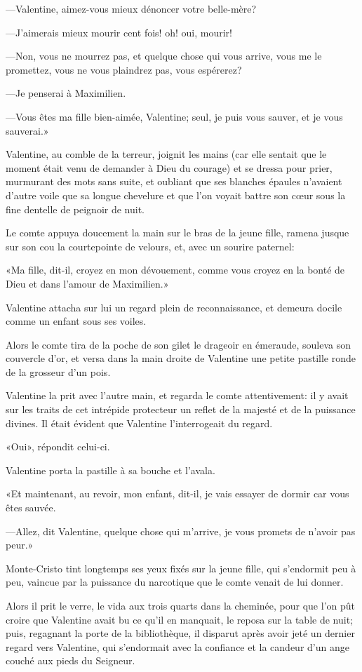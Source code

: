 —Valentine, aimez-vous mieux dénoncer votre belle-mère? 

—J'aimerais mieux mourir cent fois! oh! oui, mourir! 

—Non, vous ne mourrez pas, et quelque chose qui vous arrive, vous me le promettez, vous ne vous plaindrez pas, vous espérerez? 

—Je penserai à Maximilien. 

—Vous êtes ma fille bien-aimée, Valentine; seul, je puis vous sauver, et je vous sauverai.» 

Valentine, au comble de la terreur, joignit les mains (car elle sentait que le moment était venu de demander à Dieu du courage) et se dressa pour prier, murmurant des mots sans suite, et oubliant que ses blanches épaules n'avaient d'autre voile que sa longue chevelure et que l'on voyait battre son cœur sous la fine dentelle de peignoir de nuit. 

Le comte appuya doucement la main sur le bras de la jeune fille, ramena jusque sur son cou la courtepointe de velours, et, avec un sourire paternel: 

«Ma fille, dit-il, croyez en mon dévouement, comme vous croyez en la bonté de Dieu et dans l'amour de Maximilien.» 

Valentine attacha sur lui un regard plein de reconnaissance, et demeura docile comme un enfant sous ses voiles. 

Alors le comte tira de la poche de son gilet le drageoir en émeraude, souleva son couvercle d'or, et versa dans la main droite de Valentine une petite pastille ronde de la grosseur d'un pois. 

Valentine la prit avec l'autre main, et regarda le comte attentivement: il y avait sur les traits de cet intrépide protecteur un reflet de la majesté et de la puissance divines. Il était évident que Valentine l'interrogeait du regard. 

«Oui», répondit celui-ci. 

Valentine porta la pastille à sa bouche et l'avala. 

«Et maintenant, au revoir, mon enfant, dit-il, je vais essayer de dormir car vous êtes sauvée. 

—Allez, dit Valentine, quelque chose qui m'arrive, je vous promets de n'avoir pas peur.» 

Monte-Cristo tint longtemps ses yeux fixés sur la jeune fille, qui s'endormit peu à peu, vaincue par la puissance du narcotique que le comte venait de lui donner. 

Alors il prit le verre, le vida aux trois quarts dans la cheminée, pour que l'on pût croire que Valentine avait bu ce qu'il en manquait, le reposa sur la table de nuit; puis, regagnant la porte de la bibliothèque, il disparut après avoir jeté un dernier regard vers Valentine, qui s'endormait avec la confiance et la candeur d'un ange couché aux pieds du Seigneur. 